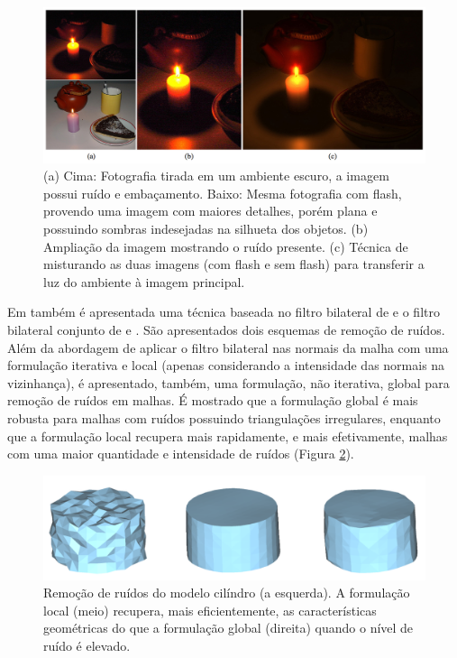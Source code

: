\begin{figure}[!h]
\captionsetup{width=\linewidth}
\centering
\includegraphics[scale=0.3]{figuras/flash-noflash.png}
\caption{(a) Cima: Fotografia tirada em um ambiente escuro, a imagem possui ruído e embaçamento. Baixo: Mesma fotografia com flash, provendo uma imagem com maiores detalhes, porém plana e possuindo sombras indesejadas na silhueta dos objetos. (b) Ampliação da imagem mostrando o ruído presente. (c) Técnica de \cite{eisemann2004flash} misturando as duas imagens (com flash e sem flash) para transferir a luz do ambiente à imagem principal.}
\label{fig:flash-noflash}
\end{figure}

Em \cite{zheng2011bilateral} também é apresentada uma técnica baseada no filtro bilateral de \cite{tomasi1998bilateral} e o filtro bilateral conjunto de \cite{eisemann2004flash} e \cite{petschnigg2004digital}. São apresentados dois esquemas de remoção de ruídos. Além da abordagem de aplicar o filtro bilateral nas normais da malha com uma formulação iterativa e local (apenas considerando a intensidade das normais na vizinhança), é apresentado, também, uma formulação, não iterativa, global para remoção de ruídos em malhas. É mostrado que a formulação global é mais robusta para malhas com ruídos possuindo triangulações irregulares, enquanto que a formulação local recupera mais rapidamente, e mais efetivamente, malhas com uma maior quantidade e intensidade de ruídos (Figura \ref{fig:globalxlocal}).

\begin{figure}[!h]
\captionsetup{width=\linewidth}
\centering
\includegraphics[scale=0.3]{figuras/globalxlocal.png}
\caption{Remoção de ruídos do modelo cilíndro (a esquerda). A formulação local (meio) recupera, mais eficientemente, as características geométricas do que a formulação global (direita) quando o nível de ruído é elevado.}
\label{fig:globalxlocal}
\end{figure}

